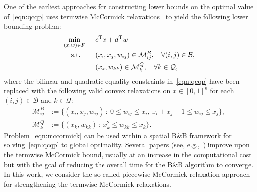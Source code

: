 \documentclass{article}
\newcommand{\pmc}{piecewise McCormick}
\begin{document}
One of the earliest approaches for constructing lower bounds on the optimal value of~\eqref{eqn:qcqp} uses termwise McCormick relaxations~\cite{al1983jointly,mccormick1976computability} to yield the following lower bounding problem:
\begin{alignat}{2}
\label{eqn:mccormick}
&\min_{(x,w) \in F} \:\: && c^{\textup{T}} x + d^{\textup{T}} w \\
&\quad\: \text{s.t.} && (x_i, x_j, w_{ij}) \in \mathcal{M}^{B}_{ij}, \quad \forall (i, j) \in \mathcal{B}, \nonumber\\
& && (x_k, w_{kk}) \in \mathcal{M}^{Q}_k, \quad \forall k \in \mathcal{Q}, \nonumber
\end{alignat}
where the bilinear and quadratic equality constraints in~\eqref{eqn:qcqp} have been replaced with the following valid convex relaxations on $x \in [0,1]^n$ for each $(i, j) \in \mathcal{B}$ and $k \in \mathcal{Q}$:
\begin{align*}
\mathcal{M}^{B}_{ij} &:= \{ (x_i, x_j, w_{ij}) \: : \: 0 \leq w_{ij} \leq x_i, \: x_i + x_j -1 \leq w_{ij} \leq x_j \}, \\
\mathcal{M}^{Q}_{k} &:= \{ (x_k, w_{kk}) \: : \: x^2_k \leq w_{kk} \leq x_k \}.
\end{align*}
Problem~\eqref{eqn:mccormick} can be used within a spatial B\&B framework for solving~\eqref{eqn:qcqp} to global optimality.
Several papers (see, e.g.,~\cite{bao2011semidefinite,bergamini2008improved,billionnet2012extending,burer2008finite,nohra2021spectral,saif2008global,sherali2013reformulation,wicaksono2008piecewise}) improve upon the termwise McCormick bound, usually at an increase in the computational cost but with the goal of reducing the overall time for the B\&B algorithm to converge.
In this work, we consider the so-called {\pmc} relaxation approach~\cite{bergamini2005logic,bergamini2008improved,castro2016normalized,karuppiah2006global,kolodziej2013global,meyer2006global,nagarajan2019adaptive,saif2008global,wicaksono2008piecewise} for strengthening the termwise McCormick relaxations.




\end{document}
